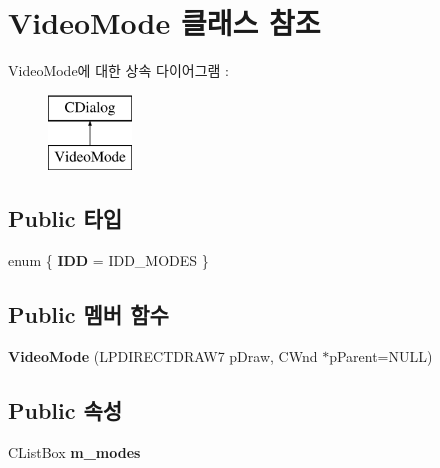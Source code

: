 \hypertarget{class_video_mode}{}\section{Video\+Mode 클래스 참조}
\label{class_video_mode}
Video\+Mode에 대한 상속 다이어그램 \+: \begin{figure}[H]
\begin{center}
\leavevmode
\includegraphics[height=2.000000cm]{class_video_mode}
\end{center}
\end{figure}
\subsection*{Public 타입}
\begin{DoxyCompactItemize}
\item 
\mbox{\label{class_video_mode_a5888f5e68b768e91695a058cace7e5a4}} 
enum \{ {\bfseries I\+DD} = I\+D\+D\+\_\+\+M\+O\+D\+ES
 \}
\end{DoxyCompactItemize}
\subsection*{Public 멤버 함수}
\begin{DoxyCompactItemize}
\item 
\mbox{\label{class_video_mode_a1546b8240c6190c4c3f951ffcb74411c}} 
{\bfseries Video\+Mode} (L\+P\+D\+I\+R\+E\+C\+T\+D\+R\+A\+W7 p\+Draw, C\+Wnd $\ast$p\+Parent=N\+U\+LL)
\end{DoxyCompactItemize}
\subsection*{Public 속성}
\begin{DoxyCompactItemize}
\item 
\mbox{\label{class_video_mode_a89d4dd07ee169f0f6f4f845582fa3695}} 
C\+List\+Box {\bfseries m\+\_\+modes}
\end{DoxyCompactItemize}
